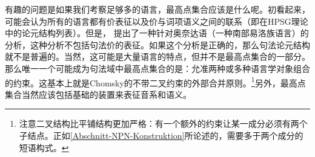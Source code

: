 有趣的问题是如果我们考察足够多的语言，最高点集合应该是什么呢。初看起来，可能会认为所有的语言都有价表征以及价与词项语义之间的联系（即在HPSG理论中的论元结构列表）。但是， \citet{KM2012a}提出了一种针对奥奈达语（一种南部易洛族语言）的分析，这种分析不包括句法价的表征。如果这个分析是正确的，那么句法论元结构就不是普遍的。当然，这可能是大量语言的特点，但并不是最高点集合的一部分。那么唯一一个可能成为句法域中最高点集合的是：允准两种或多种语言学对象组合的约束。这基本上就是Chomsky的不带二叉约束的外部合并原则。\footnote{%
注意二叉结构比平铺结构更加严格：有一个额外的约束让某一成分必须有两个子结点。正如\ref{Abschnitt-NPN-Konstruktion}所论述的，需要多于两个成分的短语构式。  
}另外，最高点集合当然应该包括基础的装置来表征音系和语义。

